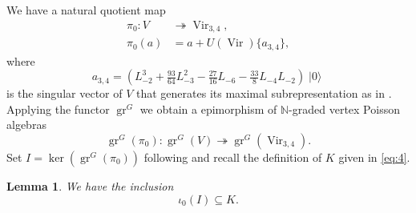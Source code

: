 \documentclass[a4paper, 12pt, reqno]{amsart}
\newtheorem{lemma}[theorem]{Lemma}
\theoremstyle{remark}
\DeclareMathOperator{\Vir}{Vir}
\DeclareMathOperator{\gr}{gr}
\DeclareMathOperator{\vac}{|0\rangle}
\begin{document}
We have a natural quotient map
\begin{align*}
  \pi_0: V &\twoheadrightarrow \Vir_{3, 4}, \\
  \pi_0(a) &= a + U(\Vir)\{a_{3, 4}\},
\end{align*}
where
\begin{equation*}
  a_{3, 4} = (L_{-2}^3 + \tfrac{93}{64}L_{-3}^2 - \tfrac{27}{16}L_{-6} - \tfrac{33}{8}L_{-4}L_{-2})\vac
\end{equation*}
is the singular vector of $V$ that generates its maximal subrepresentation as in \cite{andrews_singular_2022}.
Applying the functor $\gr^G$ we obtain a epimorphism of $\mathbb{N}$-graded vertex Poisson algebras
\begin{equation*}
  \gr^G(\pi_0): \gr^G(V) \twoheadrightarrow \gr^G(\Vir_{3, 4}).
\end{equation*}
Set $I = \ker(\gr^G(\pi_0))$ following \cite{andrews_singular_2022} and recall the definition of $K$ given in \eqref{eq:4}.

\begin{lemma}
  \label{lmm:9}
  We have the inclusion
  \begin{equation*}
    \iota_0(I) \subseteq K.
  \end{equation*}
\end{lemma}
\end{document}
